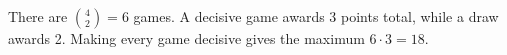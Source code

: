 There are $\binom42=6$ games. A decisive game awards 3 points total, while a draw awards 2. Making every game decisive gives the maximum $6\cdot3=\boxed{18}$.
